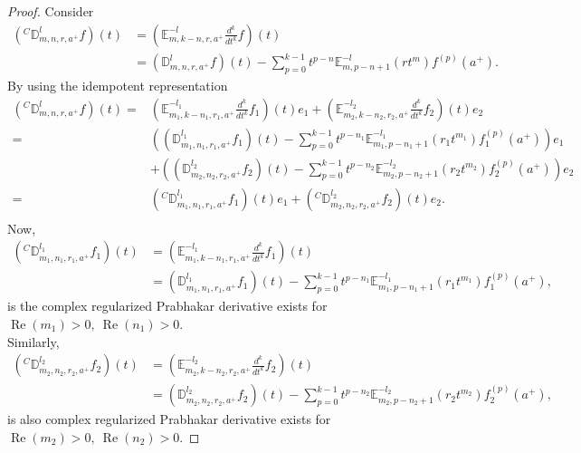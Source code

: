\documentclass[a4paper,12pt]{article}
\theoremstyle{remark}
\begin{document}
\begin{proof}
	Consider 
	\begin{equation}
	\begin{split}
	(^C\mathbb{D}_{m,n,r,a^+}^l f)(t)&=\left(\mathbb{E}_{m,k-n,r,a^+}^{-l}\frac{d^k}{dt^k}f \right) (t)\\
	&=(\mathbb{D}_{m,n,r,a^+}^l f)(t)-\sum_{p=0}^{k-1}t^{p-n}\mathbb{E}_{m,p-n+1}^{-l}(r t^m)f^{(p)}(a^+).
	\end{split}
	\end{equation}
	By using the idempotent representation
\begin{equation}
\begin{split}
\left( ^C\mathbb{D}_{m,n,r,a^+}^l f\right) (t)	=&\left(\mathbb{E}_{m_1,k-n_1,r_1,a^+}^{-l_1}\frac{d^k}{dt^k}f_1 \right) (t)e_1+\left(\mathbb{E}_{m_2,k-n_2,r_2,a^+}^{-l_2}\frac{d^k}{dt^k}f_2 \right) (t)e_2\\
=&\left( (\mathbb{D}_{m_1,n_1,r_1,a^+}^{l_1} f_1)(t)-\sum_{p=0}^{k-1}t^{p-n_1}\mathbb{E}_{m_1,p-n_1+1}^{-l_1}(r_1 t^{m_1})f_1^{(p)}(a^+)\right) e_1\\
&+\left( (\mathbb{D}_{m_2,n_2,r_2,a^+}^{l_2} f_2)(t)-\sum_{p=0}^{k-1}t^{p-n_2}\mathbb{E}_{m_2,p-n_2+1}^{-l_2}(r_2 t^{m_2})f_2^{(p)}(a^+)\right) e_2\\
=&\left( ^C\mathbb{D}_{m_1,n_1,r_1,a^+}^{l_1} f_1\right) (t) e_1+\left( ^C\mathbb{D}_{m_2,n_2,r_2,a^+}^{l_2} f_2\right) (t)e_2.\\
\end{split}
\end{equation}
Now, 	\begin{equation}
	\begin{split}
	\left( ^C\mathbb{D}_{m_1,n_1,r_1,a^+}^{l_1} f_1\right) (t)&=\left(\mathbb{E}_{m_1,k-n_1,r_1,a^+}^{-l_1}\frac{d^k}{dt^k}f_1 \right) (t)\\
	&=(\mathbb{D}_{m_1,n_1,r_1,a^+}^{l_1} f_1)(t)-\sum_{p=0}^{k-1}t^{p-n_1}\mathbb{E}_{m_1,p-n_1+1}^{-l_1}(r_1 t^{m_1})f_1^{(p)}(a^+),
	\end{split}
	\end{equation}
is the complex regularized  Prabhakar  derivative exists for $\operatorname{Re}(m_1)>0,~\operatorname{Re}(n_1)>0.$ \\
	Similarly, 	
	 	\begin{equation}
	\begin{split}
	\left( ^C\mathbb{D}_{m_2,n_2,r_2,a^+}^{l_2} f_2\right) (t)&=\left(\mathbb{E}_{m_2,k-n_2,r_2,a^+}^{-l_2}\frac{d^k}{dt^k}f_2 \right) (t)\\
	&=(\mathbb{D}_{m_2,n_2,r_2,a^+}^{l_2} f_2)(t)-\sum_{p=0}^{k-1}t^{p-n_2}\mathbb{E}_{m_2,p-n_2+1}^{-l_2}(r_2 t^{m_2})f_2^{(p)}(a^+),
	\end{split}
	\end{equation}
	is also complex regularized  Prabhakar derivative exists for $\operatorname{Re}(m_2)>0,~\operatorname{Re}(n_2)>0.$ 
    

\end{proof}
\end{document}
